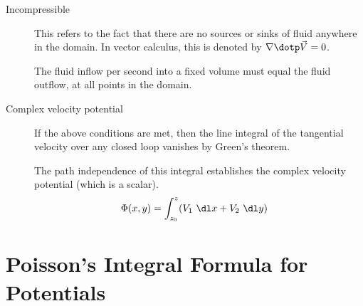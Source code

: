 \begin{description}
    \item[Incompressible] This refers to the fact that there are no sources or sinks
        of fluid anywhere in the domain. In vector calculus, this is denoted by
        $ \nabla \dotp \vec{V} = 0 $. \par
        The fluid inflow per second into a fixed volume must equal the fluid outflow, at
        all points in the domain.

    \item[Complex velocity potential]  If the above conditions are met, then the line
        integral of the tangential velocity over any closed loop vanishes by Green's
        theorem. \par
        The path independence of this integral establishes the complex velocity
        potential (which is a scalar).
        \begin{align}
            \Phi(x, y) & = \int_{z_0}^{z} (V_1\ \dl x + V_2\ \dl y)
        \end{align}
\end{description}

\section{Poisson's Integral Formula for Potentials}

